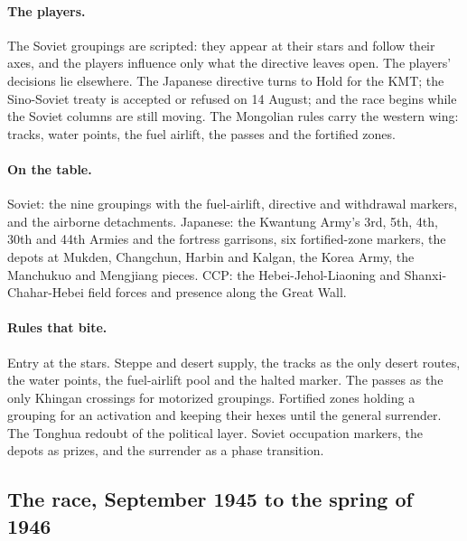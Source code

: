 \documentclass[11pt]{article}
\begin{document}
\paragraph{The players.} The Soviet groupings are scripted: they appear at their stars and follow their axes, and the players influence only what the directive leaves open. The players' decisions lie elsewhere. The Japanese directive turns to Hold for the KMT; the Sino-Soviet treaty is accepted or refused on 14 August; and the race begins while the Soviet columns are still moving. The Mongolian rules carry the western wing: tracks, water points, the fuel airlift, the passes and the fortified zones.
\paragraph{On the table.} Soviet: the nine groupings with the fuel-airlift, directive and withdrawal markers, and the airborne detachments. Japanese: the Kwantung Army's 3rd, 5th, 4th, 30th and 44th Armies and the fortress garrisons, six fortified-zone markers, the depots at Mukden, Changchun, Harbin and Kalgan, the Korea Army, the Manchukuo and Mengjiang pieces. CCP: the Hebei-Jehol-Liaoning and Shanxi-Chahar-Hebei field forces and presence along the Great Wall.
\paragraph{Rules that bite.} Entry at the stars. Steppe and desert supply, the tracks as the only desert routes, the water points, the fuel-airlift pool and the halted marker. The passes as the only Khingan crossings for motorized groupings. Fortified zones holding a grouping for an activation and keeping their hexes until the general surrender. The Tonghua redoubt of the political layer. Soviet occupation markers, the depots as prizes, and the surrender as a phase transition.
\clearpage

\subsection{The race, September 1945 to the spring of 1946}
\end{document}
